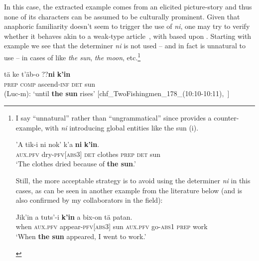 \documentclass[output=paper
,modfonts
,nonflat]{langsci/langscibook}
\begin{document}
In this case, the extracted example comes from an elicited picture-story and thus none of its characters can be assumed to be culturally prominent. 
Given that anaphoric familiarity doesn't seem to trigger the use of \textit{ni}, one may try to verify whether it behaves akin to a weak-type article~\citep{Schwarz2013}, with  based upon . Starting with example  we see that the determiner \textit{ni} is not used -- and in fact is unnatural to use -- in  cases of  like \textit{the sun}, \textit{the moon}, etc.\footnote{I say ``unnatural'' rather than ``ungrammatical'' since \citet{Knowles1984} provides a counter-example, with \textit{ni} introducing global entities like the sun (i). 
	
	\begin{exe}
	 \label{ex:pico:n5i} 
		\gll 'A tik-i ni nok' k'a \textbf{ni} \textbf{k'in}.\\
		\textsc{aux.pfv} dry-\textsc{pfv[abs3]} \textsc{det} clothes \textsc{prep} \textsc{det} sun\\
		\glt `The clothes dried because of \textbf{the sun}.'~\citep[309]{Knowles1984}
	\end{exe} 
		
	Still, the more acceptable strategy is to avoid using the determiner \textit{ni} in this cases, as can be seen in another example from the literature below (and is also confirmed by my collaborators in the field):
	
	\begin{exe}
	\label{ex:pico:n5ii}\il{Yokot'an}
		\gll Jik'in a tuts'-i \textbf{k'in} a bix-on tä patan.\\
		when \textsc{aux.pfv} appear-\textsc{pfv[abs3]} sun \textsc{aux.pfv} go-\textsc{abs1} \textsc{prep} work\\
		\glt `When \textbf{the sun} appeared, I went to work.'~\citep[113]{SchumannGalvez2012}
	\end{exe}}


\ea \label{ex:pico:7}
\gll t\"a ke t'\"ab-o {\op}\textnormal{??}\textbf{ni}{\cp} \textbf{k'in} \\
\textsc{prep} \textsc{comp} ascend-\textsc{inf} \textsc{det} {sun} \\
\glt (Luc-m): `until \textbf{the sun} rises' [chf\_TwoFishingmen\_178\_(10:10-10:11),~\citealt{Delgado-Galvan2018archive}]
\z
\end{document}
